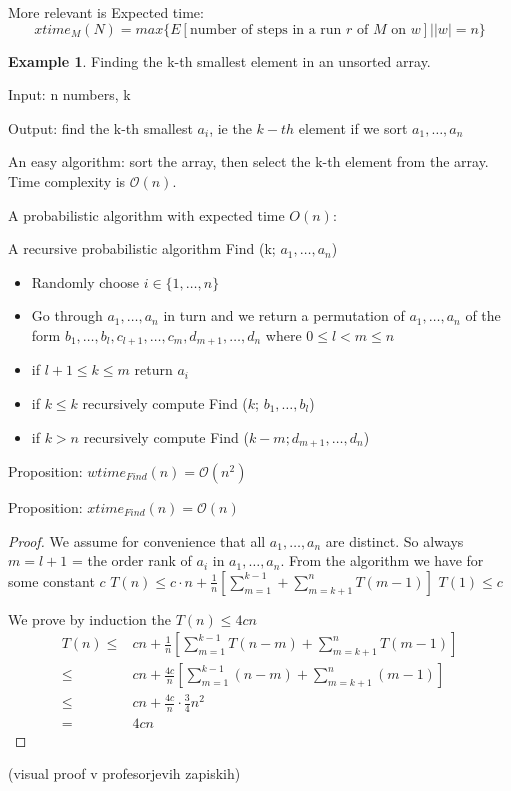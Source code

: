 \documentclass[a4paper,12pt]{article}
\theoremstyle{definition}
\newtheorem{example}[counter]{Example}
\theoremstyle{remark}
\begin{document}
More relevant is Expected time:
\begin{equation*}
    xtime_M(N) = max \{E[\text{number of steps in a run } r \text{ of } M \text{ on } w]| |w| = n\}
\end{equation*}

\begin{example}
    Finding the k-th smallest element in an unsorted array.

    Input: n numbers, k

    Output: find the k-th smallest $a_i$, ie the $k-th$ element if we sort $a_1, \dots, a_n$

    An easy algorithm: sort the array, then select the k-th element from the array. Time complexity is $\mathscr{O}(n)$.

    A probabilistic algorithm with expected time $O(n)$:

    A recursive probabilistic algorithm Find (k; $a_1, \dots, a_n$)
    \begin{itemize}
        \item Randomly choose $i \in \{1, \dots, n\}$
        \item Go through $a_1, \dots, a_n$ in turn and we return a permutation of $a_1, \dots, a_n$ of the form 
        $b_1, \dots, b_l, c_{l+1}, \dots, c_m, d_{m+1}, \dots, d_n$ where $0 \leq l < m \leq n$
        \item if $l + 1 \leq k \leq m$ return $a_i$
        \item if $k \leq k$ recursively compute Find ($k$; $b_1, \dots, b_l$)
        \item if $k > n$ recursively compute Find ($k-m; d_{m+1}, \dots, d_n$) 
    \end{itemize}

    Proposition: $wtime_{Find}(n) = \mathscr{O}(n^2)$

    Proposition: $xtime_{Find}(n) = \mathscr{O}(n)$

    \begin{proof}
        We assume for convenience that all $a_1, \dots, a_n$ are distinct.
        So always $m = l + 1$ = the order rank of $a_i$ in $a_1, \dots, a_n$.
        From the algorithm we have for some constant $c$
        $T(n) \leq c \cdot n + \frac{1}{n}[\sum_{m = 1}^{k-1} + \sum_{m = k + 1}^{n} T(m-1)]$
        $T(1) \leq c$

        We prove by induction the $T(n) \leq 4 c n$
        \begin{align*}
            T(n) \leq& cn + \frac{1}{n} [\sum_{m=1}^{k-1} T(n-m) + \sum_{m = k + 1}^{n} T(m-1)] \\
                 \leq& cn + \frac{4c}{n} [\sum_{m=1}^{k-1} (n-m) + \sum_{m = k + 1}^{n} (m-1)] \\
                 \leq& cn + \frac{4c}{n} \cdot \frac{3}{4} n^2 \\
                 =& 4cn 
        \end{align*}
    \end{proof}

    (visual proof v profesorjevih zapiskih)

\end{example}
\end{document}

